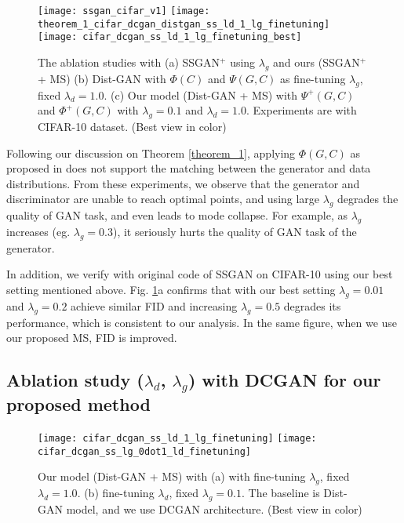 \documentclass{article}
\begin{document}
\begin{figure}
  \centering
  \texttt{[image: ssgan\_cifar\_v1]}
  \texttt{[image: theorem\_1\_cifar\_dcgan\_distgan\_ss\_ld\_1\_lg\_finetuning]}
  \texttt{[image: cifar\_dcgan\_ss\_ld\_1\_lg\_finetuning\_best]}
\caption{The ablation studies with (a) SSGAN$^+$ using $\lambda_g$ and ours (SSGAN$^+$ + MS) (b) Dist-GAN with $\Phi(C)$ and $\Psi(G,C)$ as fine-tuning $\lambda_g$, fixed $\lambda_d = 1.0$. (c) Our model (Dist-GAN + MS) with $\Psi^+(G,C)$ and $\Phi^+(G,C)$ with $\lambda_g = 0.1$ and $\lambda_d = 1.0$. Experiments are with CIFAR-10 dataset. (Best view in color)}
  \label{cifar_dcgan_dinetuning_g_d}
\end{figure}



Following our discussion 
on  Theorem \ref{theorem_1}, applying $\Phi(G,C)$ as proposed 
in 
\cite{chen-arxiv-2018}
does not support the matching between the generator and data distributions. From these experiments, we observe that the generator and discriminator are unable to reach optimal points, and using large $\lambda_g$ degrades the quality of GAN task, and even leads to mode collapse. For example, as  $\lambda_g$ increases (eg. $\lambda_g = 0.3$), it seriously hurts the quality of GAN task of the generator. 


In addition, we verify with original code of SSGAN \cite{chen-arxiv-2018} on CIFAR-10 using our best setting mentioned above. Fig. \ref{cifar_dcgan_dinetuning_g_d}a confirms that with our best setting $\lambda_g = 0.01$ and $\lambda_g = 0.2$ achieve similar FID and increasing $\lambda_g = 0.5$ degrades its performance, which is consistent to our analysis. In the same figure, when we use our proposed MS,  FID is improved.





\subsection{Ablation study ($\lambda_d$, $\lambda_g$) with DCGAN for our proposed method}
\label{ablation_study_minimax_dcgan}

\begin{figure}
  \centering
  \texttt{[image: cifar\_dcgan\_ss\_ld\_1\_lg\_finetuning]}
  \texttt{[image: cifar\_dcgan\_ss\_lg\_0dot1\_ld\_finetuning]}
  \caption{Our model (Dist-GAN + MS) with (a) with fine-tuning $\lambda_g$, fixed $\lambda_d = 1.0$. (b) fine-tuning $\lambda_d$, fixed $\lambda_g = 0.1$. The baseline is Dist-GAN model, and we use DCGAN architecture. (Best view in color)}
  \label{cifar_dcgan_finetuning_g_d}
\end{figure}
\end{document}

